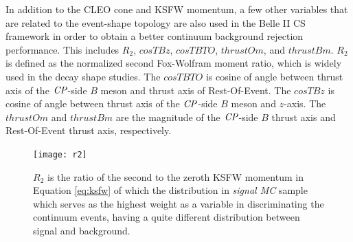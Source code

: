 In addition to the CLEO cone and KSFW momentum, a few other variables that are related to the event-shape topology are also used in the Belle II CS framework in order to obtain a better continuum background rejection performance. 
This includes $R_2$, $cosTBz$, $cosTBTO$, $thrustOm$, and $thrustBm$.
$R_2$ is defined as the normalized second Fox-Wolfram moment ratio, which is widely used in the decay shape studies.
The $cosTBTO$ is cosine of angle between thrust axis of the $\it{CP}$-side $B$ meson and thrust axis of Rest-Of-Event.
The $cosTBz$ is cosine of angle between thrust axis of the $\it{CP}$-side $B$ meson and $z$-axis.
The $thrustOm$ and $thrustBm$ are the magnitude of the $\it{CP}$-side $B$ thrust axis and Rest-Of-Event thrust axis, respectively. 


 


\begin{figure}[htpb]
	\centering
	\texttt{[image: r2]}
	\caption{$R_2$ is the ratio of the second to the zeroth KSFW momentum in Equation \ref{eq:ksfw} of which the distribution in \textit{signal MC} sample which serves as the highest weight as a variable in discriminating the continuum events, having a quite different distribution between signal and background.}
	\label{fig:R2}
\end{figure}

